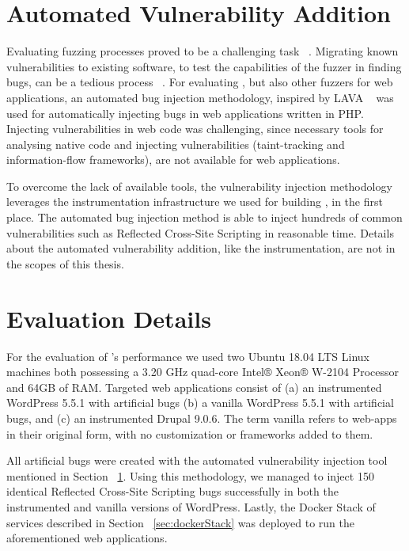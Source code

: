 \section{Automated Vulnerability Addition}\label{sec:automated}
Evaluating fuzzing processes proved to be a challenging task ~\cite{klees2018Evaluation}. Migrating known vulnerabilities to existing software, to test the capabilities of the fuzzer in finding bugs, can be a tedious process ~\cite{bug-reproduction}. For evaluating \pname{}, but also other fuzzers for web applications, an automated bug injection methodology, inspired by LAVA ~\cite{dolan2016lava} was used for automatically injecting bugs in web applications written in PHP. Injecting vulnerabilities in web code was challenging, since necessary tools for analysing native code and injecting vulnerabilities (\eg taint-tracking and information-flow frameworks), are not available for web applications. 

To overcome the lack of available tools, the vulnerability injection methodology leverages the instrumentation infrastructure we used for building \pname{}, in the first place. The automated bug injection method is able to inject hundreds of common vulnerabilities such as Reflected Cross-Site Scripting in reasonable time. Details about the automated vulnerability addition, like the instrumentation, are not in the scopes of this thesis.

\section{Evaluation Details}
For the evaluation of \pname{}'s performance we used two Ubuntu 18.04 LTS Linux machines both possessing a 3.20 GHz quad-core Intel® Xeon® W-2104 Processor and 64GB of RAM. Targeted web applications consist of (a) an instrumented WordPress 5.5.1 with artificial bugs (b) a vanilla  WordPress 5.5.1 with artificial bugs, and (c) an instrumented Drupal 9.0.6. The term vanilla refers to web-apps in their original form, with no customization or frameworks added to them. 

All artificial bugs were created with the automated vulnerability injection tool mentioned in  Section ~\ref{sec:automated}. Using this methodology, we managed to inject 150 identical Reflected Cross-Site Scripting bugs successfully in both the instrumented and vanilla versions of WordPress. Lastly, the Docker Stack of services described in Section ~\ref{sec:dockerStack} was deployed to run the aforementioned web applications.

